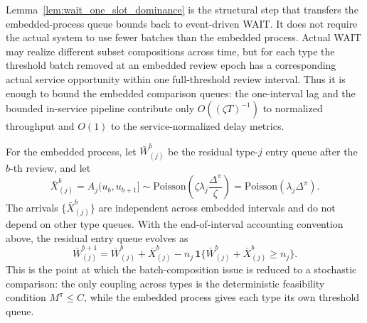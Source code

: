 Lemma~\ref{lem:wait_one_slot_dominance} is the structural step that transfers the embedded-process queue bounds back to event-driven WAIT. It does not require the actual system to use fewer batches than the embedded process. Actual WAIT may realize different subset compositions across time, but for each type the threshold batch removed at an embedded review epoch has a corresponding actual service opportunity within one full-threshold review interval. Thus it is enough to bound the embedded comparison queues: the one-interval lag and the bounded in-service pipeline contribute only \(O((\zeta T)^{-1})\) to normalized throughput and \(O(1)\) to the service-normalized delay metrics.

For the embedded process, let \(\bar W^b_{(j)}\) be the residual type-\(j\) entry queue after the \(b\)-th review, and let
\[
    \bar X^b_{(j)}
    =A_j(u_b,u_{b+1}]
    \sim \text{Poisson}\!\left(\zeta\lambda_j\frac{\Delta^\pi}{\zeta}\right)
    =\text{Poisson}(\lambda_j\Delta^\pi).
\]
The arrivals \(\{\bar X^b_{(j)}\}\) are independent across embedded intervals and do not depend on other type queues. With the end-of-interval accounting convention above, the residual entry queue evolves as
\[
    \bar W^{b+1}_{(j)}
    =
    \bar W^b_{(j)}+\bar X^b_{(j)}
    -
    n_j\,\mathbf{1}\{\bar W^b_{(j)}+\bar X^b_{(j)}\ge n_j\}.
\]
This is the point at which the batch-composition issue is reduced to a stochastic comparison: the only coupling across types is the deterministic feasibility condition \(M^\pi\le C\), while the embedded process gives each type its own threshold queue.

